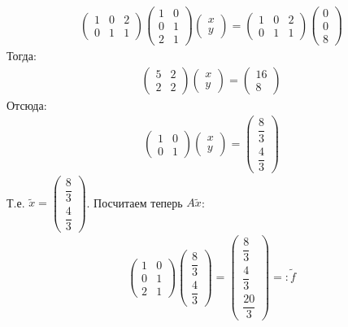 \documentclass[11pt,a4paper]{report}
\begin{document}
\begin{gather*}
	\begin{pmatrix} 1&0&2\\0&1&1 \end{pmatrix}\begin{pmatrix} 1&0\\0&1\\2&1 \end{pmatrix}\begin{pmatrix} x\\y \end{pmatrix}=\begin{pmatrix} 1&0&2\\0&1&1 \end{pmatrix}\begin{pmatrix} 0\\0\\8 \end{pmatrix}
\end{gather*}
Тогда:
\begin{gather*}
	\begin{pmatrix} 5&2\\2&2 \end{pmatrix}\begin{pmatrix} x\\y \end{pmatrix}=\begin{pmatrix} 16\\8 \end{pmatrix}
\end{gather*}
Отсюда:
\begin{gather*}
	\begin{pmatrix} 1&0\\0&1 \end{pmatrix}\begin{pmatrix} x\\y \end{pmatrix}=\begin{pmatrix} \dfrac{8}{3}\\[2ex]\dfrac{4}{3} \end{pmatrix}
\end{gather*}
Т.е. $\tilde{x} = \begin{pmatrix} \dfrac{8}{3}\\[2ex]\dfrac{4}{3} \end{pmatrix}$. Посчитаем теперь $A\tilde{x}$:
\begin{gather*}
	\begin{pmatrix} 1&0\\0&1\\2&1 \end{pmatrix}\begin{pmatrix} \dfrac{8}{3}\\[2ex]\dfrac{4}{3} \end{pmatrix}=\begin{pmatrix} \dfrac{8}{3}\\[2ex]\dfrac{4}{3}\\[2ex]\dfrac{20}{3} \end{pmatrix} =: \tilde{f}
\end{gather*}
\end{document}
